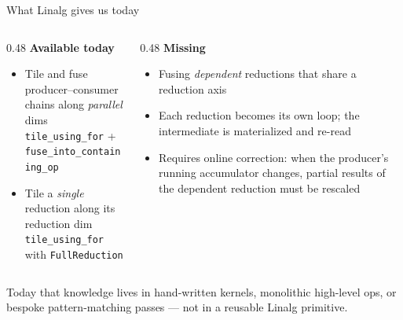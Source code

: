\documentclass[10pt, aspectratio=169]{beamer}
\newcommand{\code}[1]{\texttt{\small #1}}
\begin{document}
\begin{frame}{What Linalg gives us today}
  \begin{columns}[t]
    \begin{column}{0.48\textwidth}
      \textbf{Available today}
      \begin{itemize}\small
        \item Tile and fuse producer--consumer chains along \emph{parallel} dims\\
          {\scriptsize\code{tile\_using\_for} + \code{fuse\_into\_containing\_op}}
        \item Tile a \emph{single} reduction along its reduction dim\\
          {\scriptsize\code{tile\_using\_for} with \code{FullReduction}}
      \end{itemize}
    \end{column}
    \begin{column}{0.48\textwidth}
      \textbf{\alert{Missing}}
      \begin{itemize}\small
        \item Fusing \emph{dependent} reductions that share a reduction axis
        \item Each reduction becomes its own loop; the intermediate is
          materialized and re-read
        \item Requires \alert{online correction}: when the producer's running
          accumulator changes, partial results of the dependent reduction must be
          rescaled
      \end{itemize}
    \end{column}
  \end{columns}

  \vspace{4mm}
  \small Today that knowledge lives in hand-written kernels, monolithic
  high-level ops, or bespoke pattern-matching passes --- not in a reusable
  Linalg primitive.
\end{frame}
\end{document}
